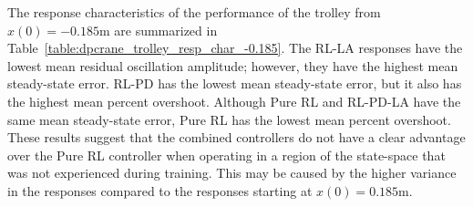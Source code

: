 The response characteristics of the performance of the trolley from $x(0)=-0.185\si{\meter}$ are summarized in Table~\ref{table:dpcrane_trolley_resp_char_-0.185}.
%
The RL-LA responses have the lowest mean residual oscillation amplitude; however, they have the highest mean steady-state error. RL-PD has the lowest mean steady-state error, but it also has the highest mean percent overshoot. Although Pure RL and RL-PD-LA have the same mean steady-state error, Pure RL has the lowest mean percent overshoot.
%
These results suggest that the combined controllers do not have a clear advantage over the Pure RL controller when operating in a region of the state-space that was not experienced during training. This may be caused by the higher variance in the responses compared to the responses starting at $x(0)=0.185\si{\meter}$.

